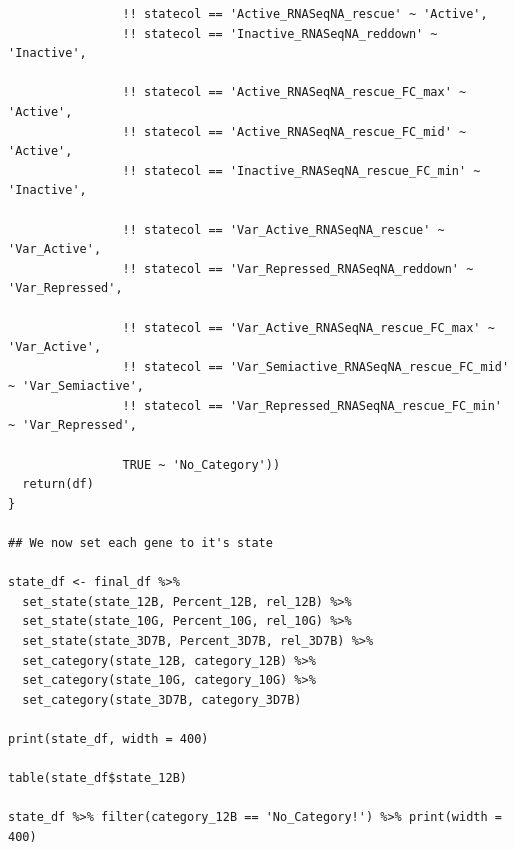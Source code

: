 \documentclass[11pt]{article}
\begin{document}
\begin{verbatim}
                !! statecol == 'Active_RNASeqNA_rescue' ~ 'Active',
                !! statecol == 'Inactive_RNASeqNA_reddown' ~ 'Inactive',

                !! statecol == 'Active_RNASeqNA_rescue_FC_max' ~ 'Active',
                !! statecol == 'Active_RNASeqNA_rescue_FC_mid' ~ 'Active',
                !! statecol == 'Inactive_RNASeqNA_rescue_FC_min' ~ 'Inactive',

                !! statecol == 'Var_Active_RNASeqNA_rescue' ~ 'Var_Active',
                !! statecol == 'Var_Repressed_RNASeqNA_reddown' ~ 'Var_Repressed',

                !! statecol == 'Var_Active_RNASeqNA_rescue_FC_max' ~ 'Var_Active',
                !! statecol == 'Var_Semiactive_RNASeqNA_rescue_FC_mid' ~ 'Var_Semiactive',
                !! statecol == 'Var_Repressed_RNASeqNA_rescue_FC_min' ~ 'Var_Repressed',

                TRUE ~ 'No_Category'))
  return(df)
}

## We now set each gene to it's state

state_df <- final_df %>%
  set_state(state_12B, Percent_12B, rel_12B) %>%
  set_state(state_10G, Percent_10G, rel_10G) %>%
  set_state(state_3D7B, Percent_3D7B, rel_3D7B) %>%
  set_category(state_12B, category_12B) %>%
  set_category(state_10G, category_10G) %>%
  set_category(state_3D7B, category_3D7B)

print(state_df, width = 400)

table(state_df$state_12B)

state_df %>% filter(category_12B == 'No_Category!') %>% print(width = 400)

\end{verbatim}
\end{document}
